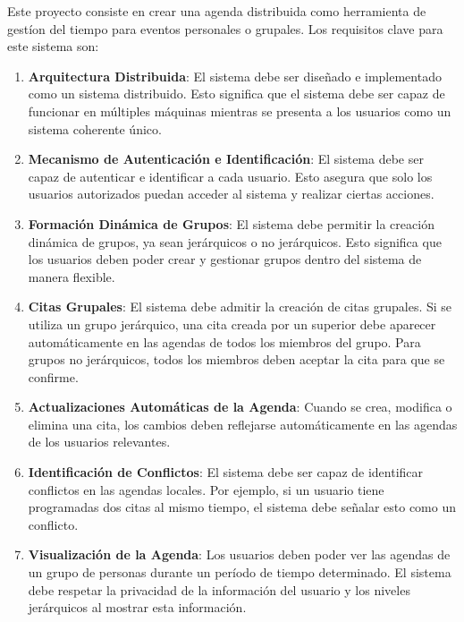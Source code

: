 \documentclass[10pt]{article} %
\begin{document}
	Este proyecto consiste en crear una agenda distribuida como herramienta de gest\'ion del tiempo para eventos personales o grupales. Los requisitos clave para este sistema son:
	\begin{enumerate}
		\item \textbf{Arquitectura Distribuida}: El sistema debe ser diseñado e implementado como un sistema distribuido. Esto significa que el sistema debe ser capaz de funcionar en múltiples máquinas mientras se presenta a los usuarios como un sistema coherente único.
		
		\item \textbf{Mecanismo de Autenticación e Identificación}: El sistema debe ser capaz de autenticar e identificar a cada usuario. Esto asegura que solo los usuarios autorizados puedan acceder al sistema y realizar ciertas acciones.
		
		\item \textbf{Formación Dinámica de Grupos}: El sistema debe permitir la creación dinámica de grupos, ya sean jerárquicos o no jerárquicos. Esto significa que los usuarios deben poder crear y gestionar grupos dentro del sistema de manera flexible.
		
		\item \textbf{Citas Grupales}: El sistema debe admitir la creación de citas grupales. Si se utiliza un grupo jerárquico, una cita creada por un superior debe aparecer automáticamente en las agendas de todos los miembros del grupo. Para grupos no jerárquicos, todos los miembros deben aceptar la cita para que se confirme.
		
		\item \textbf{Actualizaciones Automáticas de la Agenda}: Cuando se crea, modifica o elimina una cita, los cambios deben reflejarse automáticamente en las agendas de los usuarios relevantes.
		
		\item \textbf{Identificación de Conflictos}: El sistema debe ser capaz de identificar conflictos en las agendas locales. Por ejemplo, si un usuario tiene programadas dos citas al mismo tiempo, el sistema debe señalar esto como un conflicto.
		
		\item \textbf{Visualización de la Agenda}: Los usuarios deben poder ver las agendas de un grupo de personas durante un período de tiempo determinado. El sistema debe respetar la privacidad de la información del usuario y los niveles jerárquicos al mostrar esta información.
	\end{enumerate}
	
\end{document}
